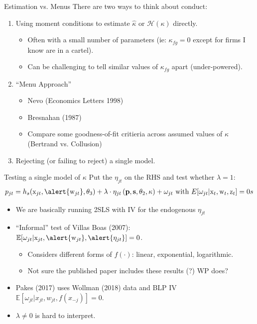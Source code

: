 \documentclass[xcolor=pdftex,dvipsnames,table,mathserif,aspectratio=169]{beamer}
\begin{document}
\begin{frame}{Estimation vs. Menus}
There are two ways to think about conduct:
\begin{enumerate}
\item Using moment conditions to estimate $\widehat{\kappa}$ or $\mathcal{H}(\kappa)$ directly.
\begin{itemize}
\item Often with a small number of parameters (ie: $\kappa_{fg}=0$ except for firms I know are in a cartel).
\item Can be challenging to tell similar values of $\kappa_{fg}$ apart (under-powered).
\end{itemize}
\item ``Menu Approach''
\begin{itemize}
\item  Nevo (Economics Letters 1998)
\item Bresnahan (1987)
\item Compare some goodness-of-fit critieria across assumed values of $\kappa$ (Bertrand vs. Collusion)
  \end{itemize}
\item Rejecting (or failing to reject) a single model.
  \end{enumerate}
\end{frame}


\begin{frame}{Testing a single model of $\kappa$}
Put the $\eta_{jt}$ on the RHS and test whether $\lambda=1$:
\begin{align*}
 p_{jt} = h_s(\textrm{x}_{jt}, \alert{\textrm{w}_{jt}},\theta_3) + \lambda \cdot \eta_{jt}\left(\mathbf{p},\mathbf{s},\theta_2,\kappa \right)+  \omega_{jt} \text{ with }
 E[\omega_{jt} | \textrm{x}_{t},\textrm{w}_{t},\textrm{z}_{t}]=0s
\end{align*}
\vspace{-0.25cm}
\begin{itemize}
\item We are basically running 2SLS with IV for the endogenous $\eta_{jt}$
\item ``Informal'' test of Villas Boas (2007): $\mathbb{E}[\omega_{jt} | \textrm{x}_{jt},\alert{\textrm{w}_{jt}},\alert{\eta_{jt}}]=0$.
\begin{itemize}
\item Considers different forms of $f(\cdot)$: linear, exponential, logarithmic.
\item Not sure the published paper includes these results (?) WP does?
  \end{itemize}
\item Pakes (2017) uses Wollman (2018) data and BLP IV $\mathbb{E}[\omega_{jt} | x_{jt},w_{jt},f(x_{-j})]=0$.
\item $\lambda \neq 0$ is hard to interpret.
\end{itemize}
\end{frame}
\end{document}
